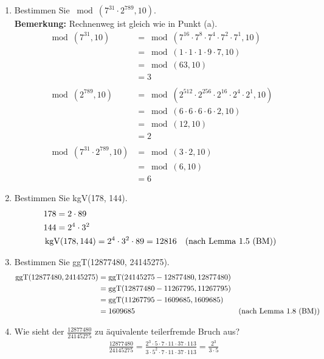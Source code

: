 \begin{enumerate}[label=(\alph*)]
		\item  Bestimmen Sie $ \bmod(7^{31} \cdot 2^{789}, 10) $. \\
		\textbf{Bemerkung:} Rechnenweg ist gleich wie in Punkt (a).
		\begin{align*}
			\bmod(7^{31},10) &= \bmod(7^{16}\cdot7^{8}\cdot7^{4}\cdot7^{2}\cdot7^{1},10)
			\\&= \bmod(1\cdot1\cdot1\cdot9\cdot7,10)
			\\&= \bmod(63,10)
			\\&= 3 \\\\
			\bmod(2^{789},10) &= \bmod(2^{512}\cdot2^{256}\cdot2^{16}\cdot2^4\cdot2^1,10)
			\\&= \bmod(6\cdot 6\cdot 6\cdot 6\cdot 2, 10)
			\\&= \bmod(12,10)
			\\&= 2 \\\\
			\bmod(7^{31} \cdot 2^{789}, 10) &= \bmod(3 \cdot 2,10)
			\\&= \bmod(6,10)
			\\&= 6 
		\end{align*}

		\item Bestimmen Sie kgV(178, 144).
		\begin{align*}
			& 178 = 2\cdot89 \\
			& 144 = 2^4\cdot3^2 \\
			&\operatorname{kgV}(178, 144) = 2^4\cdot3^2\cdot89 = 12816
		 	&\textrm{(nach Lemma 1.5 (BM))}
		\end{align*}

		\item Bestimmen Sie ggT(12877480, 24145275).
		\begin{align*}
			\operatorname{ggT}(12877480, 24145275) &= \operatorname{ggT}(24145275-12877480, 12877480)
			\\& = \operatorname{ggT}(12877480-11267795,11267795)
			\\& = \operatorname{ggT}(11267795-1609685,1609685)
			\\& = 1609685
		 	&\textrm{(nach Lemma 1.8 (BM))}
		\end{align*}

		\item Wie sieht der $\frac{12877480}{24145275}$ zu äquivalente teilerfremde Bruch aus?
		\begin{align*}
			& \frac{12877480}{24145275} = \frac{2^3 \cdot 5 \cdot 7 \cdot 11 \cdot 37 \cdot 113}
			{3 \cdot 5^2 \cdot 7 \cdot 11 \cdot 37 \cdot 113} = \frac{2^3}{3 \cdot 5}
		\end{align*}


\end{enumerate}
